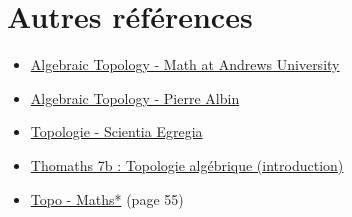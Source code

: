 \chapter{Autres références}

\begin{itemize}
    \item \href{https://www.youtube.com/playlist?list=PLOROtRhtegr7DmeMyFxfKxsljAVsAn_X4}{Algebraic Topology - Math at Andrews University}
    \item \href{https://www.youtube.com/playlist?list=PLpRLWqLFLVTCL15U6N3o35g4uhMSBVA2b}{Algebraic Topology - Pierre Albin}
    \item \href{https://www.youtube.com/playlist?list=PLMRkEU6bT3aq8j-kAc5ZGJM8zyutaxu1T}{Topologie - Scientia Egregia}
    \item \href{https://www.youtube.com/watch?v=MNTkrbo0i2s}{Thomaths 7b : Topologie algébrique (introduction)}
    \item \href{https://www.normalesup.org/~fjacobe/Topo.pdf}{Topo - Maths*} (page 55) 
\end{itemize}